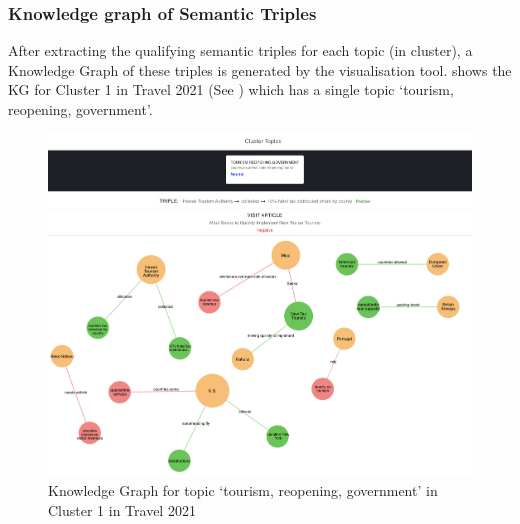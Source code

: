 \subsubsection*{Knowledge graph of Semantic Triples}

After extracting the qualifying semantic triples for each topic (in cluster), a Knowledge Graph of these triples is generated by the visualisation tool.  shows the KG for Cluster 1 in Travel 2021 (See ) which has a single topic `tourism, reopening, government'. 

\vspace{-1ex}

\begin{figure}[H]
  \centering
  \includegraphics[width=0.94\linewidth]{images/travel2021_triples_witha.png}
  \caption{Knowledge Graph for topic `tourism, reopening, government' in Cluster 1 in Travel 2021}
  \vspace{-1ex}
  \label{fig:triples_travel2021}
\end{figure}


